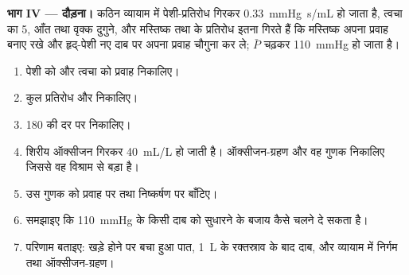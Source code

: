 \begin{problem}
\medskip
\noindent\textbf{भाग IV --- दौड़ना।}
कठिन व्यायाम में पेशी-प्रतिरोध गिरकर \qty{0.33}{mmHg.s/mL} हो जाता है,
त्वचा का 5, आँत तथा वृक्क दुगुने, और मस्तिष्क तथा  के प्रतिरोध इतना गिरते
हैं कि मस्तिष्क अपना प्रवाह बनाए रखे और हृद्-पेशी नए दाब पर अपना
प्रवाह चौगुना कर ले; $\bar P$ चढ़कर \qty{110}{mmHg} हो जाता है।
\begin{enumerate}[resume]
  \item पेशी को और त्वचा को प्रवाह निकालिए।
  \item कुल प्रतिरोध और  निकालिए।
  \item 180 की दर पर  निकालिए।
  \item शिरीय ऑक्सीजन गिरकर \qty{40}{mL/L} हो जाती है।
        ऑक्सीजन-ग्रहण और वह गुणक निकालिए जिससे वह विश्राम से बड़ा है।
  \item उस गुणक को प्रवाह पर तथा निष्कर्षण पर बाँटिए।
  \item समझाइए कि  \qty{110}{mmHg} के किसी दाब को
        सुधारने के बजाय कैसे चलने दे सकता है।
  \item परिणाम बताइए: खड़े होने पर बचा हुआ पात, \qty{1}{L} के
        रक्तस्राव के बाद दाब, और व्यायाम में निर्गम
        तथा ऑक्सीजन-ग्रहण।
\end{enumerate}
\end{problem}
